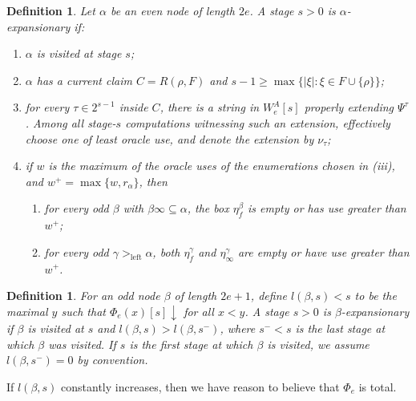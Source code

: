 \documentclass[10pt,a4paper]{amsart}
\newtheorem{definition}[theorem]{Definition}
\begin{document}
\begin{definition}\label{d6}
    Let $\alpha$ be an even node of length $2e$.  A stage $s>0$
is \emph{$\alpha$-expansionary} if:

\begin{enumerate}[label=(\roman*)]
\item $\alpha$ is visited at stage $s$;
\item $\alpha$ has a current claim $C=R(\rho,F)$ and
      $s-1\geq \max\{ |\xi|:\xi\in F\cup\{\rho\}\}$;
\item for every $\tau\in 2^{s-1}$ inside $C$, there is a string in
      $W_e^A[s]$ properly extending $\Psi^\tau$.  Among all stage-$s$
      computations witnessing such an extension, effectively choose one of least oracle
      use, and denote the extension
      by $\nu_\tau$;
\item if $w$ is the maximum of the oracle uses of the enumerations chosen in
      (iii), and $ w^+=\max\{w,r_\alpha\}$,
      then 
      \begin{enumerate}[label=(\alph*)]
      \item for every odd $\beta$ with $\beta\infty\subseteq\alpha$, the box
            $\eta_f^\beta$ is empty or has use greater than $w^+$;
      \item for every odd $\gamma>_{\mathrm{left}}\alpha$, both
            $\eta_f^\gamma$ and $\eta_\infty^\gamma$ are empty or have use
            greater than $w^+$.
      \end{enumerate}
\end{enumerate}
\end{definition}

\begin{definition}
    For an odd node $\beta$ of length $2e+1$, define $l(\beta,s)<s$ to be the maximal $y$ such that $\Phi_e(x)[s]\downarrow$ for all $x<y$.
A stage $s>0$ is \emph{$\beta$-expansionary} if $\beta$ is visited at $s$ and
$l(\beta,s)>l(\beta,s^-)$, where $s^-<s$ is the last stage at which
$\beta$ was visited. If $s$ is the first stage at which $\beta$ is visited, we assume $l(\beta,s^-)=0$ by convention.
\end{definition}

If $l (\beta, s)$ constantly increases, then we have reason
to believe that $\Phi_e$ is total. 
\end{document}
